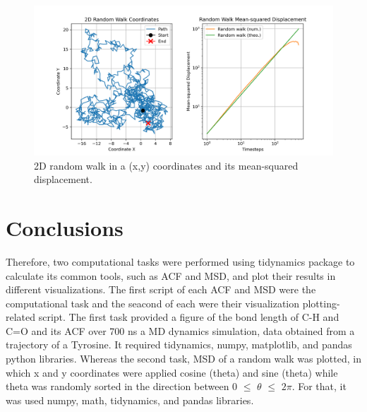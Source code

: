 \documentclass{article}
\begin{document}
\begin{figure}[H]
\includegraphics[width=\linewidth]{msd_plot.png}
\caption{2D random walk in a (x,y) coordinates and its mean-squared displacement.}
\label{fig:msd_plot}
\end{figure}

\section{Conclusions}

Therefore, two computational tasks were performed using tidynamics package to calculate its common tools, such as ACF and MSD, and plot their results in different visualizations. The first script of each ACF and MSD were the computational task and the seacond of each were their visualization plotting-related script. The first task provided a figure of the bond length of C-H and C=O and its ACF over 700 ns a MD dynamics simulation, data obtained from a trajectory of a Tyrosine. It required tidynamics, numpy, matplotlib, and pandas python libraries. Whereas the second task, MSD of a random walk was plotted, in which x and y coordinates were applied cosine (theta) and sine (theta) while theta was randomly sorted in the direction between 0 $\leq$ $\theta$ $\leq$ $2\pi$. For that, it was used numpy, math, tidynamics, and pandas libraries.



\end{document}
